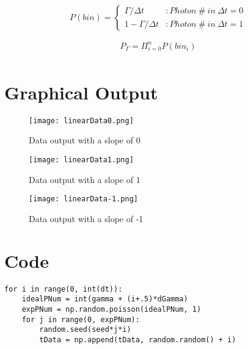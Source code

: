 \documentclass[aps,letterpaper,10pt]{revtex4}
\begin{document}
\begin{displaymath}
   P(bin) = \left\{
     \begin{array}{lr}
       \Gamma /\Delta t & : Photon\ \#\ in\ \Delta t = 0\\
       1-\Gamma /\Delta t & : Photon\ \#\ in\ \Delta t = 1
     \end{array}
   \right.
\end{displaymath}

\begin{gather*}
	P_\Gamma = \Pi_{i = 0}^{n} P(bin_i)\\
\end{gather*}

\vspace{3mm} 

\section{Graphical Output}

\begin{figure}[h!]
\begin{center} \texttt{[image: linearData0.png]} \caption{Data output with a slope of 0} \end{center}
\vspace{3mm}
\end{figure}

\begin{figure}[h!]
\begin{center} \texttt{[image: linearData1.png]} \caption{Data output with a slope of 1} \end{center}
\vspace{3mm}
\end{figure}

\begin{figure}[h!]
\begin{center} \texttt{[image: linearData-1.png]} \caption{Data output with a slope of -1} \end{center}
\vspace{3mm}
\end{figure}

\section{Code}

\begin{verbatim}
for i in range(0, int(dt)):
    idealPNum = int(gamma + (i+.5)*dGamma)
    expPNum = np.random.poisson(idealPNum, 1)
    for j in range(0, expPNum):
        random.seed(seed*j*i)
        tData = np.append(tData, random.random() + i)
\end{verbatim}
\end{document}
